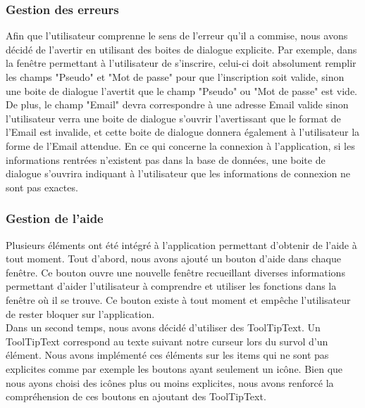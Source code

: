 \documentclass[11pt]{article}
\begin{document}
\subsubsection{Gestion des erreurs}
Afin que l'utilisateur comprenne le sens de l'erreur qu'il a commise, nous avons décidé de l'avertir en utilisant des boites de dialogue explicite. Par exemple, dans la fenêtre permettant à l'utilisateur de s'inscrire, celui-ci doit absolument remplir les champs "Pseudo" et "Mot de passe" pour que l'inscription soit valide, sinon une boite de dialogue l'avertit que le champ "Pseudo" ou "Mot de passe" est vide. De plus, le champ "Email" devra correspondre à une adresse Email valide sinon l'utilisateur verra une boite de dialogue s'ouvrir l'avertissant que le format de l'Email est invalide, et cette boite de dialogue donnera également à l'utilisateur la forme de l'Email attendue. En ce qui concerne la connexion à l'application, si les informations rentrées n'existent pas dans la base de données, une boite de dialogue s'ouvrira indiquant à l'utilisateur que les informations de connexion ne sont pas exactes.

\subsubsection{Gestion de l'aide}
Plusieurs éléments ont été intégré à l'application permettant d'obtenir de l'aide à tout moment. Tout d'abord, nous avons ajouté un bouton d'aide dans chaque fenêtre. Ce bouton ouvre une nouvelle fenêtre recueillant diverses informations permettant d'aider l'utilisateur à comprendre et utiliser les fonctions dans la fenêtre où il se trouve. Ce bouton existe à tout moment et empêche l'utilisateur de rester bloquer sur l'application.~\\
Dans un second temps, nous avons décidé d'utiliser des ToolTipText. Un ToolTipText correspond au texte suivant notre curseur lors du survol d'un élément. Nous avons implémenté ces éléments sur les items qui ne sont pas explicites comme par exemple les boutons ayant seulement un icône. Bien que nous ayons choisi des icônes plus ou moins explicites, nous avons renforcé la compréhension de ces boutons en ajoutant des ToolTipText.
\end{document}
